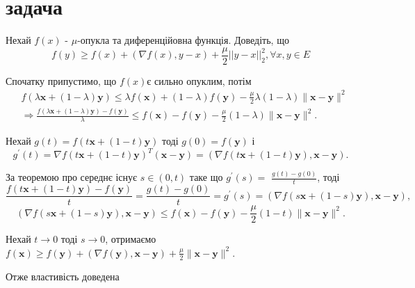 \section{задача}


\begin{tcolorbox}[title = Умова]
    Нехай $f(x)$ - $\mu$-опукла та диференційовна функція. Доведіть, що 
    \begin{equation}
        f(y) \geq f(x) + (\nabla f(x) , y - x) + \frac{\mu}{2} ||y - x||_2^2, \forall x, y \in E
    \end{equation}
\end{tcolorbox}

Спочатку припустимо, що $f(x) $є сильно опуклим, потім
$$
\begin{aligned}
& f(\lambda \mathbf{x}+(1-\lambda) \mathbf{y}) \leq \lambda f(\mathbf{x})+(1-\lambda) f(\mathbf{y})-\frac{\mu}{2} \lambda(1-\lambda)\|\mathbf{x}-\mathbf{y}\|^2 \\
& \Rightarrow \frac{f(\lambda \mathbf{x}+(1-\lambda) \mathbf{y})-f(\mathbf{y})}{\lambda} \leq f(\mathbf{x})-f(\mathbf{y})-\frac{\mu}{2}(1-\lambda)\|\mathbf{x}-\mathbf{y}\|^2 .
\end{aligned}
$$

Нехай $g(t)=f(t \mathbf{x}+(1-t) \mathbf{y})$ тоді $g(0)=f(\mathbf{y})$ і
$$
g^{\prime}(t)=\nabla f(t \mathbf{x}+(1-t) \mathbf{y})^T(\mathbf{x}-\mathbf{y})=(\nabla f(t \mathbf{x}+(1-t) \mathbf{y}), \mathbf{x}-\mathbf{y}) .
$$

За теоремою про середнє існує $s \in(0, t)$ таке що $g^{\prime}(s)=$ $\frac{g(t)-g(0)}{t}$, тоді
$$
\frac{f(t \mathbf{x}+(1-t) \mathbf{y})-f(\mathbf{y})}{t}=\frac{g(t)-g(0)}{t}=g^{\prime}(s)=(\nabla f(s \mathbf{x}+(1-s) \mathbf{y}), \mathbf{x}-\mathbf{y}),
$$
$$
(\nabla f(s \mathbf{x}+(1-s) \mathbf{y}), \mathbf{x}-\mathbf{y}) \leq f(\mathbf{x})-f(\mathbf{y})-\frac{\mu}{2}(1-t)\|\mathbf{x}-\mathbf{y}\|^2 .
$$

Нехай $t \rightarrow 0$ тоді $s \rightarrow 0$, отримаємо $f(\mathbf{x}) \geq f(\mathbf{y})+(\nabla f(\mathbf{y}), \mathbf{x}-\mathbf{y})+\frac{\mu}{2}\|\mathbf{x}-\mathbf{y}\|^2$.

Отже властивість доведена